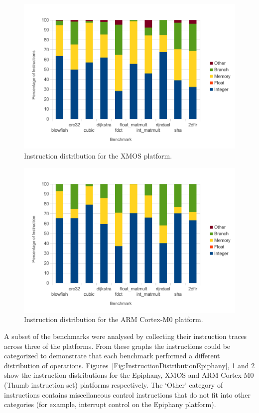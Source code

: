 \documentclass[twocolumn]{article}
\begin{document}
\begin{figure}[t]
	\includegraphics[width=\linewidth]{xmos.pdf}
	\caption{Instruction distribution for the XMOS platform.}
	\label{Fig:InstructionDistributionXMOS}
\end{figure}

\begin{figure}[t]
	\includegraphics[width=\linewidth]{arm.pdf}
	\caption{Instruction distribution for the ARM Cortex-M0 platform.}
	\label{Fig:InstructionDistributionARM}
\end{figure}

A subset of the benchmarks were analysed by collecting their instruction traces across three of the platforms. From these graphs the instructions could be categorized to demonstrate that each benchmark performed a different distribution of operations. Figures~\ref{Fig:InstructionDistributionEpiphany}, \ref{Fig:InstructionDistributionXMOS} and \ref{Fig:InstructionDistributionARM} show the instruction distributions for the Epiphany, XMOS and ARM Cortex-M0 (Thumb instruction set) platforms respectively. The `Other' category of instructions contains miscellaneous control instructions that do not fit into other categories (for example, interrupt control on the Epiphany platform).
\end{document}
